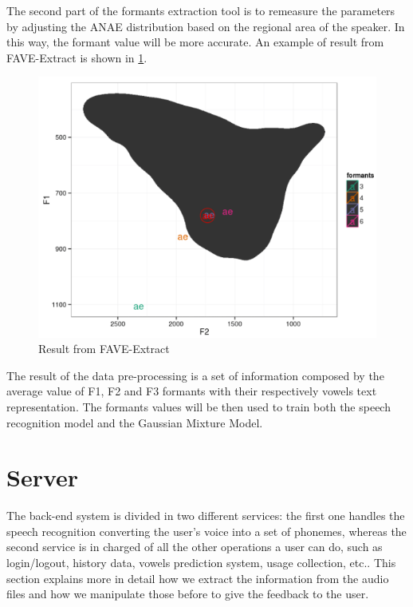 \noindent The second part of the formants extraction tool is to remeasure the parameters by adjusting the ANAE distribution based on the regional area of the speaker. In this way, the formant value will be more accurate. An example of result from FAVE-Extract is shown in \ref{fig:fave-extract_example}.

\begin{figure}[!ht]
	\centering
	\includegraphics[scale=0.5]{Figures/fave-extract_example.png}
	\caption{Result from FAVE-Extract}
	\label{fig:fave-extract_example}
\end{figure}

\noindent The result of the data pre-processing is a set of information composed by the average value of F1, F2 and F3 formants with their respectively vowels text representation. The formants values will be then used to train both the speech recognition model and the Gaussian Mixture Model.

\section{Server}
\label{sec:server}

The back-end system is divided in two different services: the first one handles the speech recognition converting the user's voice into a set of phonemes, whereas the second service is in charged of all the other operations a user can do, such as login/logout, history data, vowels prediction system, usage collection, etc.. This section explains more in detail how we extract the information from the audio files and how we manipulate those before to give the feedback to the user.

